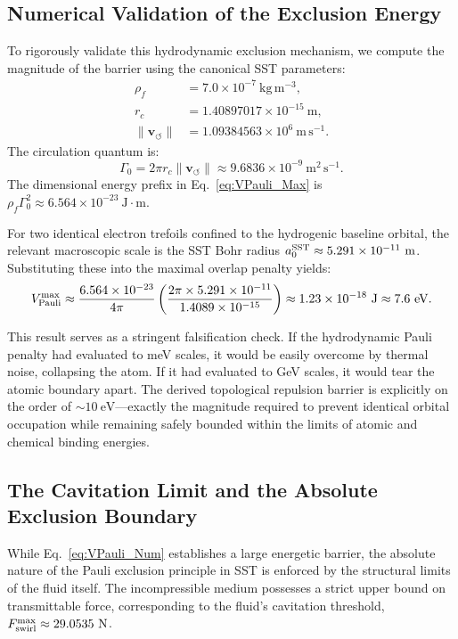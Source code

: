 \documentclass[11pt,a4paper]{article}
\begin{document}
\subsection{Numerical Validation of the Exclusion Energy}
To rigorously validate this hydrodynamic exclusion mechanism, we compute the magnitude of the barrier using the canonical SST parameters:
\begin{align}
\rho_{\!f} &= 7.0 \times 10^{-7}\ \mathrm{kg\,m^{-3}}, \\
r_c &= 1.40897017 \times 10^{-15}\ \mathrm{m}, \\
\lVert\mathbf{v}_{\!\boldsymbol{\circlearrowleft}}\rVert &= 1.09384563 \times 10^6\ \mathrm{m\,s^{-1}}.
\end{align}
The circulation quantum is:
\begin{equation}
\Gamma_0 = 2\pi r_c \lVert\mathbf{v}_{\!\boldsymbol{\circlearrowleft}}\rVert \approx 9.6836 \times 10^{-9}\ \mathrm{m^2\,s^{-1}}.
\end{equation}
The dimensional energy prefix in Eq.~\eqref{eq:VPauli_Max} is $\rho_{\!f} \Gamma_0^2 \approx 6.564 \times 10^{-23}\ \mathrm{J \cdot m}$.

For two identical electron trefoils confined to the hydrogenic baseline orbital, the relevant macroscopic scale is the SST Bohr radius $a_0^{\rm SST} \approx 5.291 \times 10^{-11}\ \mathrm{m}$. Substituting these into the maximal overlap penalty yields:
\begin{equation}
\label{eq:VPauli_Num}
V_{\rm Pauli}^{\rm max} \approx \frac{6.564 \times 10^{-23}}{4\pi} \left( \frac{2\pi \times 5.291 \times 10^{-11}}{1.4089 \times 10^{-15}} \right) \approx 1.23 \times 10^{-18}\ \mathrm{J} \approx 7.6\ \mathrm{eV}.
\end{equation}

This result serves as a stringent falsification check. If the hydrodynamic Pauli penalty had evaluated to meV scales, it would be easily overcome by thermal noise, collapsing the atom. If it had evaluated to GeV scales, it would tear the atomic boundary apart. The derived topological repulsion barrier is explicitly on the order of $\sim 10\ \mathrm{eV}$---exactly the magnitude required to prevent identical orbital occupation while remaining safely bounded within the limits of atomic and chemical binding energies.

\subsection{The Cavitation Limit and the Absolute Exclusion Boundary}
While Eq.~\eqref{eq:VPauli_Num} establishes a large energetic barrier, the absolute nature of the Pauli exclusion principle in SST is enforced by the structural limits of the fluid itself. The incompressible medium possesses a strict upper bound on transmittable force, corresponding to the fluid's cavitation threshold, $F_{\rm swirl}^{\max} \approx 29.0535\ \mathrm{N}$.
\end{document}
